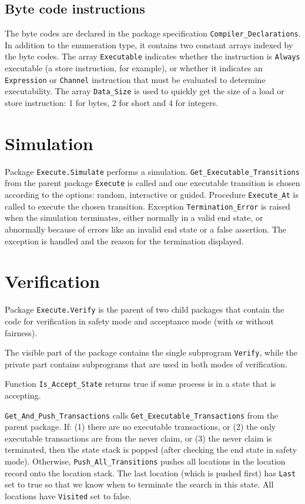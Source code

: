 \documentclass[11pt]{article}
\newcommand*{\p}[1]{\texttt{#1}}
\begin{document}
\subsection{Byte code instructions}

The byte codes are declared in the package specification
\p{Compiler\_Declarations}. In addition to the enumeration type, it
contains two constant arrays indexed by the byte codes. The array
\p{Executable} indicates whether the instruction is \p{Always}
executable (a store instruction, for example), or whether it indicates
an \p{Expression} or \p{Channel} instruction that must be evaluated to
determine executability. The array \p{Data\_Size} is used to quickly get
the size of a load or store instruction: 1 for bytes, 2 for short and 4
for integers.

\section{Simulation}
Package \p{Execute.Simulate} performs a simulation.
\p{Get\_Executable\_Transitions} from the parent package \p{Execute} is
called and one executable transition is chosen according to the options:
random, interactive or guided. Procedure \p{Execute\_At} is called to
execute the chosen transition. Exception \p{Termination\_Error} is raised
when the simulation terminates, either normally in a valid end state, or
abnormally because of errors like an invalid end state or a false
assertion. The exception is handled and the reason for the termination
displayed.

\section{Verification}\label{s.verif}
Package \p{Execute.Verify} is the parent of two child packages that
contain the code for verification in safety mode and acceptance mode
(with or without fairness).

The visible part of the package contains the single subprogram
\p{Verify}, while the private part contains subprograms that are used in
both modes of verification.

Function \p{Is\_Accept\_State} returns true if some process is in a
state that is accepting.

\p{Get\_And\_Push\_Transactions} calls \p{Get\_Executable\_Transactions}
from the parent package. If: (1) there are no executable transactions,
or (2) the only executable transactions are from the never claim, or (3)
the never claim is terminated, then the state stack is popped (after
checking the end state in safety mode). Otherwise,
\p{Push\_All\_Transitions} pushes all locations in the location record
onto the location stack. The last location (which is pushed first) has
\p{Last} set to true so that we know when to terminate the search in
this state. All locations have \p{Visited} set to false.
\end{document}
